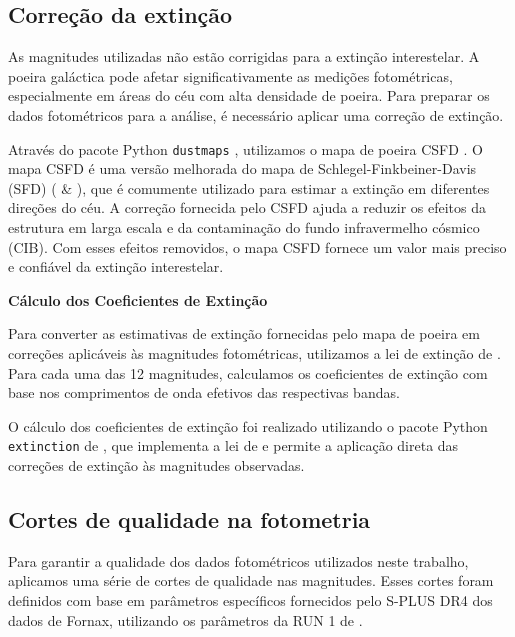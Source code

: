 \subsection{Correção da extinção}\label{sec:Coeficientes_ext}

As magnitudes utilizadas não estão corrigidas para a extinção interestelar. A poeira galáctica pode afetar significativamente as medições fotométricas, especialmente em áreas do céu com alta densidade de poeira. Para preparar os dados fotométricos para a análise, é necessário aplicar uma correção de extinção.

Através do pacote Python \texttt{dustmaps} \citep{dustmapsGreen2018}, utilizamos o mapa de poeira CSFD \citep{chiang2023correctedsfdaccurategalactic}. O mapa CSFD é uma versão melhorada do mapa de Schlegel-Finkbeiner-Davis (SFD) (\citealt{Schlegel_1998} \& \citealt{Schlafly_2011}), que é comumente utilizado para estimar a extinção em diferentes direções do céu. A correção fornecida pelo CSFD ajuda a reduzir os efeitos da estrutura em larga escala e da contaminação do fundo infravermelho cósmico (CIB). Com esses efeitos removidos, o mapa CSFD fornece um valor mais preciso e confiável da extinção interestelar.

\textbf{Cálculo dos Coeficientes de Extinção}

Para converter as estimativas de extinção fornecidas pelo mapa de poeira em correções aplicáveis às magnitudes fotométricas, utilizamos a lei de extinção de \cite{cardelli1989dust}. Para cada uma das 12 magnitudes, calculamos os coeficientes de extinção com base nos comprimentos de onda efetivos das respectivas bandas.

\sloppy
O cálculo dos coeficientes de extinção foi realizado utilizando o pacote Python \texttt{extinction} de \cite{barbary2017extinction}, que implementa a lei de \cite{cardelli1989dust} e permite a aplicação direta das correções de extinção às magnitudes observadas.

\subsection{Cortes de qualidade na fotometria}\label{subsec:cuts}
Para garantir a qualidade dos dados fotométricos utilizados neste trabalho, aplicamos uma série de cortes de qualidade nas magnitudes. Esses cortes foram definidos com base em parâmetros específicos fornecidos pelo S-PLUS DR4 dos dados de Fornax, utilizando os parâmetros da RUN 1 de \cite{haack2024splusfornaxprojectsfp}.

